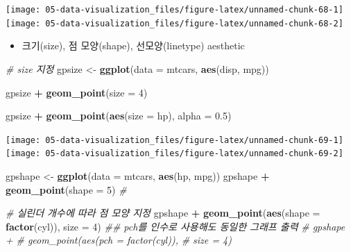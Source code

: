 \documentclass[
  11pt,
]{krantz}
\newenvironment{Shaded}{\begin{snugshade}}{\end{snugshade}}
\newcommand{\CommentTok}[1]{\textcolor[rgb]{0.37,0.37,0.37}{\textit{#1}}}
\newcommand{\DataTypeTok}[1]{\textcolor[rgb]{0.27,0.27,0.27}{#1}}
\newcommand{\DecValTok}[1]{\textcolor[rgb]{0.06,0.06,0.06}{#1}}
\newcommand{\FloatTok}[1]{\textcolor[rgb]{0.06,0.06,0.06}{#1}}
\newcommand{\KeywordTok}[1]{\textcolor[rgb]{0.27,0.27,0.27}{\textbf{#1}}}
\newcommand{\NormalTok}[1]{#1}
\newcommand{\OperatorTok}[1]{\textcolor[rgb]{0.43,0.43,0.43}{\textbf{#1}}}
\newcommand{\StringTok}[1]{\textcolor[rgb]{0.5,0.5,0.5}{#1}}
\providecommand{\tightlist}{%
  \setlength{\itemsep}{0pt}\setlength{\parskip}{0pt}}
\begin{document}
\texttt{[image: 05-data-visualization\_files/figure-latex/unnamed-chunk-68-1]} \texttt{[image: 05-data-visualization\_files/figure-latex/unnamed-chunk-68-2]}

\normalsize

\begin{itemize}
\tightlist
\item
  크기(size), 점 모양(shape), 선모양(linetype) aesthetic
\end{itemize}

\footnotesize

\begin{Shaded}
\begin{Highlighting}[]
\CommentTok{# size 지정}
\NormalTok{gpsize <-}\StringTok{ }\KeywordTok{ggplot}\NormalTok{(}\DataTypeTok{data =}\NormalTok{ mtcars, }
                 \KeywordTok{aes}\NormalTok{(disp, mpg))}

\NormalTok{gpsize }\OperatorTok{+}\StringTok{ }\KeywordTok{geom_point}\NormalTok{(}\DataTypeTok{size =} \DecValTok{4}\NormalTok{)}

\NormalTok{gpsize }\OperatorTok{+}\StringTok{ }\KeywordTok{geom_point}\NormalTok{(}\KeywordTok{aes}\NormalTok{(}\DataTypeTok{size =}\NormalTok{ hp), }
                    \DataTypeTok{alpha =} \FloatTok{0.5}\NormalTok{)}
\end{Highlighting}
\end{Shaded}

\texttt{[image: 05-data-visualization\_files/figure-latex/unnamed-chunk-69-1]} \texttt{[image: 05-data-visualization\_files/figure-latex/unnamed-chunk-69-2]}

\normalsize

\footnotesize

\begin{Shaded}
\begin{Highlighting}[]
\NormalTok{gpshape <-}\StringTok{ }\KeywordTok{ggplot}\NormalTok{(}\DataTypeTok{data =}\NormalTok{ mtcars, }
                  \KeywordTok{aes}\NormalTok{(hp, mpg))}
\NormalTok{gpshape }\OperatorTok{+}\StringTok{ }
\StringTok{  }\KeywordTok{geom_point}\NormalTok{(}\DataTypeTok{shape =} \DecValTok{5}\NormalTok{) }\CommentTok{# }

\CommentTok{# 실린더 개수에 따라 점 모양 지정}
\NormalTok{gpshape }\OperatorTok{+}\StringTok{ }
\StringTok{  }\KeywordTok{geom_point}\NormalTok{(}\KeywordTok{aes}\NormalTok{(}\DataTypeTok{shape =} \KeywordTok{factor}\NormalTok{(cyl)), }
             \DataTypeTok{size =} \DecValTok{4}\NormalTok{)}
\CommentTok{## pch를 인수로 사용해도 동일한 그래프 출력}
\CommentTok{# gpshape + }
\CommentTok{#   geom_point(aes(pch = factor(cyl)), }
\CommentTok{#              size = 4)}
\end{Highlighting}
\end{Shaded}
\end{document}
